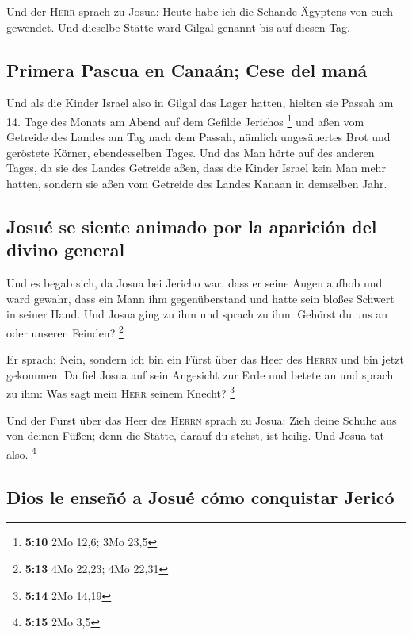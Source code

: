  Und der \textsc{Herr} sprach zu Josua: Heute habe ich die
Schande Ägyptens von euch gewendet. Und dieselbe Stätte ward Gilgal
genannt bis auf diesen Tag.

\hypertarget{primera-pascua-en-canauxe1n-cese-del-manuxe1}{%
\subsection{Primera Pascua en Canaán; Cese del
maná}\label{primera-pascua-en-canauxe1n-cese-del-manuxe1}}

 Und als die Kinder Israel also in Gilgal das Lager
hatten, hielten sie Passah am 14. Tage des Monats am Abend auf dem
Gefilde Jerichos \footnote{\textbf{5:10} 2Mo 12,6; 3Mo 23,5}
 und aßen vom Getreide des Landes am Tag nach dem Passah,
nämlich ungesäuertes Brot und geröstete Körner, ebendesselben Tages.
 Und das Man hörte auf des anderen Tages, da sie des
Landes Getreide aßen, dass die Kinder Israel kein Man mehr hatten,
sondern sie aßen vom Getreide des Landes Kanaan in demselben Jahr.

\hypertarget{josuuxe9-se-siente-animado-por-la-apariciuxf3n-del-divino-general}{%
\subsection{Josué se siente animado por la aparición del divino
general}\label{josuuxe9-se-siente-animado-por-la-apariciuxf3n-del-divino-general}}

 Und es begab sich, da Josua bei Jericho war, dass er
seine Augen aufhob und ward gewahr, dass ein Mann ihm gegenüberstand und
hatte sein bloßes Schwert in seiner Hand. Und Josua ging zu ihm und
sprach zu ihm: Gehörst du uns an oder unseren Feinden? \footnote{\textbf{5:13}
  4Mo 22,23; 4Mo 22,31}

 Er sprach: Nein, sondern ich bin ein Fürst über das Heer
des \textsc{Herrn} und bin jetzt gekommen. Da fiel Josua auf sein
Angesicht zur Erde und betete an und sprach zu ihm: Was sagt mein
\textsc{Herr} seinem Knecht? \footnote{\textbf{5:14} 2Mo 14,19}

 Und der Fürst über das Heer des \textsc{Herrn} sprach zu
Josua: Zieh deine Schuhe aus von deinen Füßen; denn die Stätte, darauf
du stehst, ist heilig. Und Josua tat also. \footnote{\textbf{5:15} 2Mo
  3,5}

\hypertarget{dios-le-enseuxf1uxf3-a-josuuxe9-cuxf3mo-conquistar-jericuxf3}{%
\subsection{Dios le enseñó a Josué cómo conquistar
Jericó}\label{dios-le-enseuxf1uxf3-a-josuuxe9-cuxf3mo-conquistar-jericuxf3}}

